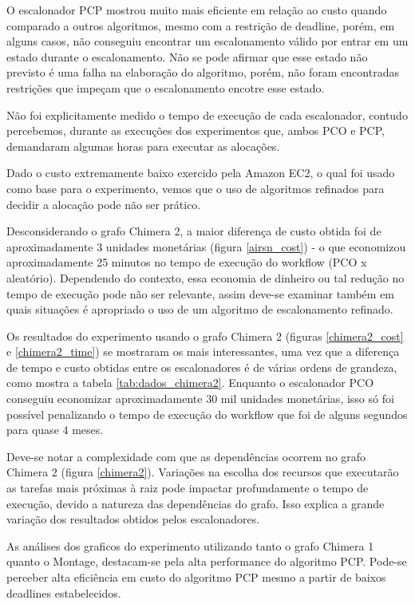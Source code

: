 \documentclass[a4paper,10pt]{article}
\begin{document}
O escalonador PCP mostrou muito mais eficiente em relação ao custo quando comparado a outros algoritmos, mesmo com a restrição de deadline, porém, em alguns casos, não conseguiu encontrar um escalonamento válido por entrar em um estado durante o escalonamento. Não se pode afirmar que esse estado não previsto é uma falha na elaboração do algoritmo, porém, não foram encontradas restrições que impeçam que o escalonamento encotre esse estado.

Não foi explicitamente medido o tempo de execução de cada escalonador, contudo percebemos,
durante as execuções dos experimentos que, ambos PCO e PCP, demandaram algumas horas para
executar as alocações.

Dado o custo extremamente baixo exercido pela Amazon EC2, o qual foi usado como base para
o experimento, vemos que o uso de algoritmos refinados para decidir a alocação pode não ser
prático.

Desconsiderando o grafo Chimera 2, a maior diferença de custo obtida foi de aproximadamente
3 unidades monetárias (figura \ref{airsn_cost}) - o que economizou aproximadamente
25 minutos no tempo de execução do workflow (PCO x aleatório).
Dependendo do contexto, essa economia de dinheiro ou tal redução no tempo de execução pode não
ser relevante, assim deve-se examinar também em quais situações é apropriado o uso de um algoritmo
de escalonamento refinado.

Os resultados do experimento usando o grafo Chimera 2 (figuras \ref{chimera2_cost} e \ref{chimera2_time})
se mostraram os mais interessantes, uma vez que a diferença de tempo e custo obtidas entre os escalonadores
é de várias ordens de grandeza, como mostra a tabela \ref{tab:dados_chimera2}. Enquanto o escalonador PCO
conseguiu economizar aproximadamente 30 mil unidades monetárias, isso só foi possível penalizando o tempo
de execução do workflow que foi de alguns segundos para quase 4 meses.

Deve-se notar a complexidade com que as dependências ocorrem no grafo Chimera 2 (figura \ref{chimera2}).
Variações na escolha dos recursos que executarão as tarefas mais próximas à raiz pode impactar profundamente
o tempo de execução, devido a natureza das dependências do grafo. Isso explica a grande variação dos resultados
obtidos pelos escalonadores.

As análises dos graficos do experimento utilizando tanto o grafo Chimera 1 quanto o Montage, destacam-se pela alta performance do algoritmo PCP. Pode-se perceber alta eficiência em custo do algoritmo PCP mesmo a partir de baixos deadlines estabelecidos.
\end{document}
